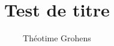 \documentclass[a4paper,twoside]{memoir}
\begin{document}
\frontmatter

\author{Théotime Grohens}
\title{Test de titre}

\maketitle

\pagebreak

\tableofcontents
\listoffigures

\mainmatter









\end{document}
